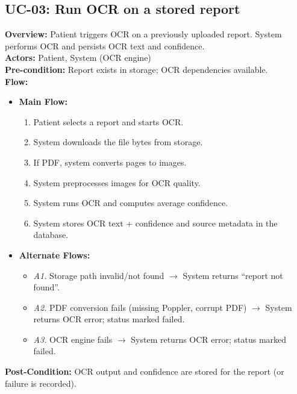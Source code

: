 \documentclass[12pt, a4paper]{article}
\begin{document}
\subsection*{UC-03: Run OCR on a stored report}
\textbf{Overview:} Patient triggers OCR on a previously uploaded report. System performs OCR and persists OCR text and confidence. \\
\textbf{Actors:} Patient, System (OCR engine) \\
\textbf{Pre-condition:} Report exists in storage; OCR dependencies available. \\
\textbf{Flow:}
\begin{itemize}[leftmargin=*]
    \item \textbf{Main Flow:}
    \begin{enumerate}
        \item Patient selects a report and starts OCR.
        \item System downloads the file bytes from storage.
        \item If PDF, system converts pages to images.
        \item System preprocesses images for OCR quality.
        \item System runs OCR and computes average confidence.
        \item System stores OCR text + confidence and source metadata in the database.
    \end{enumerate}
    \item \textbf{Alternate Flows:}
    \begin{itemize}
        \item \textit{A1.} Storage path invalid/not found $\rightarrow$ System returns “report not found”.
        \item \textit{A2.} PDF conversion fails (missing Poppler, corrupt PDF) $\rightarrow$ System returns OCR error; status marked failed.
        \item \textit{A3.} OCR engine fails $\rightarrow$ System returns OCR error; status marked failed.
    \end{itemize}
\end{itemize}
\textbf{Post-Condition:} OCR output and confidence are stored for the report (or failure is recorded).
\end{document}

